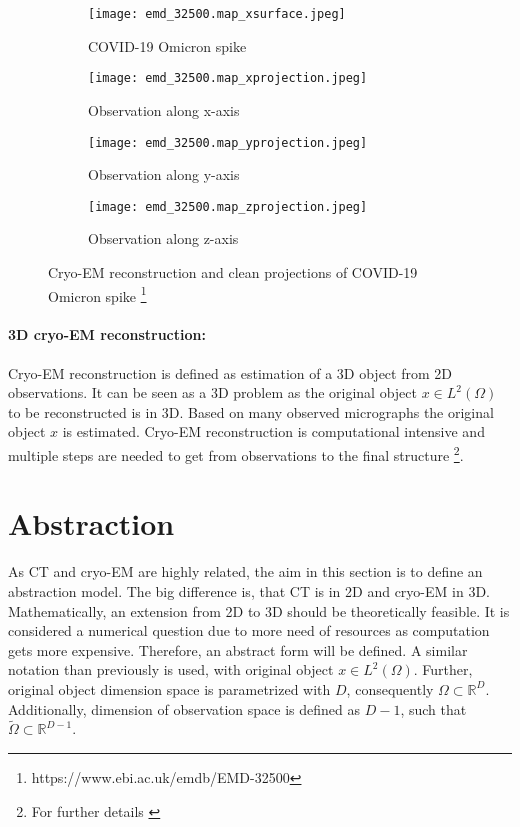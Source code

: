 \begin{figure}[H]
    \captionsetup[subfigure]{justification=centering}
    \centering
    \begin{subfigure}[t]{0.2\textwidth}
        \texttt{[image: emd\_32500.map\_xsurface.jpeg]}
        \caption{COVID-19 Omicron spike}
    \end{subfigure} \hfill
    \begin{subfigure}[t]{0.2\textwidth}
      \texttt{[image: emd\_32500.map\_xprojection.jpeg]}
      \caption{Observation along x-axis}
    \end{subfigure}\hfill
    \begin{subfigure}[t]{0.2\textwidth}
      \texttt{[image: emd\_32500.map\_yprojection.jpeg]}
      \caption{Observation along y-axis}
    \end{subfigure}\hfill
    \begin{subfigure}[t]{0.2\textwidth}
        \texttt{[image: emd\_32500.map\_zprojection.jpeg]}
        \caption{Observation along z-axis}
      \end{subfigure}
    \caption{Cryo-EM reconstruction and clean projections of COVID-19 Omicron spike \protect\footnote{https://www.ebi.ac.uk/emdb/EMD-32500}}
    \label{fig:cryo-em-omicron}
  \end{figure}


\paragraph{3D cryo-EM reconstruction:}
Cryo-EM reconstruction is defined as estimation of a 3D object from 2D observations.
It can be seen as a 3D problem as the original object $x \in L^2(\Omega)$ to be reconstructed is in 3D.
Based on many observed micrographs the original object $x$ is estimated.
Cryo-EM reconstruction is computational intensive and multiple steps are needed to get from 
observations to the final structure \footnote{For further details \cite{singleParticleCryoEm, cryoEmMath}}.



\section{Abstraction}
As CT and cryo-EM are highly related, the aim in this section is to define
an abstraction model. The big difference is, that CT is in 2D and cryo-EM in 3D.
Mathematically, an extension from 2D to 3D should be theoretically feasible. 
It is considered a numerical question due to more need of resources as computation gets more expensive.
Therefore, an abstract form will be defined.
A similar notation than previously is used, with original object $x \in L^2(\Omega)$.
Further, original object dimension space is parametrized with $D$, consequently $\Omega \subset \mathbb{R}^D$.
Additionally, dimension of observation space is defined as $D-1$, such that 
$\tilde{\Omega} \subset \mathbb{R}^{D-1}$.


